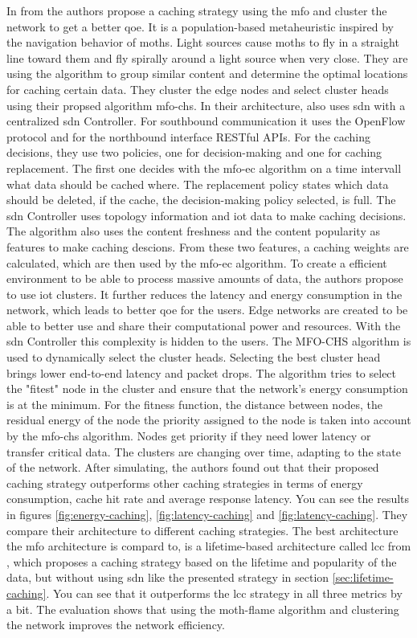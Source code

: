 \documentclass[conference]{IEEEtran}
\begin{document}
	In \cite{caching-1} from \citeyear{caching-1} the authors propose a caching strategy using the \acf{mfo} and cluster the network to get a better \acf{qoe}. It is a population-based metaheuristic inspired by the navigation behavior of moths. Light sources cause moths to fly in a straight line toward them and fly spirally around a light source when very close. They are using the algorithm to group similar content and determine the optimal locations for caching certain data. They cluster the edge nodes and select cluster heads using their propsed algorithm \ac{mfo-chs}.
	In their architecture, also uses \ac{sdn} with a centralized \ac{sdn} Controller. For southbound communication it uses the OpenFlow protocol and for the northbound interface RESTful APIs. For the caching decisions, they use two policies, one for decision-making and one for caching replacement. The first one decides with the \ac{mfo-ec} algorithm on a time intervall what data should be cached where. The replacement policy states which data should be deleted, if the cache, the decision-making policy selected, is full. The \ac{sdn} Controller uses topology information and \ac{iot} data to make caching decisions. The algorithm also uses the content freshness and the content popularity as features to make caching descions. From these two features, a caching weights are calculated, which are then used by the \ac{mfo-ec} algorithm. 
	To create a efficient environment to be able to process massive amounts of data, the authors propose to use \ac{iot} clusters. It further reduces the latency and energy consumption in the network, which leads to better \ac{qoe} for the users. Edge networks are created to be able to better use and share their computational power and resources. With the \ac{sdn} Controller this complexity is hidden to the users. The MFO-CHS algorithm is used to dynamically select the cluster heads. Selecting the best cluster head brings lower end-to-end latency and packet drops. The algorithm tries to select the "fitest" node in the cluster and ensure that the network's energy consumption is at the minimum. For the fitness function, the distance between nodes, the residual energy of the node the priority assigned to the node is taken into account by the \ac{mfo-chs} algorithm. Nodes get priority if they need lower latency or transfer critical data. The clusters are changing over time, adapting to the state of the network. After simulating, the authors found out that their proposed caching strategy outperforms other caching strategies in terms of energy consumption, cache hit rate and average response latency. You can see the results in figures \ref{fig:energy-caching}, \ref{fig:latency-caching} and \ref{fig:latency-caching}. They compare their architecture to different caching strategies. The best architecture the \ac{mfo} architecture is compard to, is a lifetime-based architecture called \ac{lcc} from \cite{caching-6}, which proposes a caching strategy based on the lifetime and popularity of the data, but without using \ac{sdn} like the presented strategy \cite{caching-2} in section \ref{sec:lifetime-caching}. You can see that it outperforms the \ac{lcc} strategy in all three metrics by a bit. The evaluation shows that using the moth-flame algorithm and clustering the network improves the network efficiency.
\end{document}
